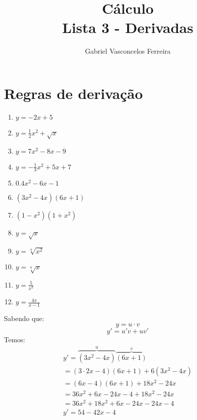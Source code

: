 \documentclass{jhwhw}
\title{Cálculo\\Lista 3 - Derivadas}
\author{Gabriel Vasconcelos Ferreira}
\begin{document}
\maketitle
\chapter{Regras de derivação}
\begin{multicols}{3}[]
    \begin{enumerate}
        \item $\displaystyle y = -2x + 5$
        \item $\displaystyle y = \frac{1}{2}x^2 + \sqrt{x}$
        \item $\displaystyle y = 7x^2- 8x - 9$
        \item $\displaystyle y = -\frac{1}{3} x^2 + 5x + 7$
        \item $\displaystyle 0.4 x^2 -6x -1$
        \item $\displaystyle (3x^2 - 4x)(6x+1)$
        \item $\displaystyle (1-x^2)(1+x^2)$
        \item $\displaystyle y = \sqrt{x}$
        \item $\displaystyle y = \sqrt[4]{x^2}$
        \item $\displaystyle y = \sqrt[9]{x}$
        \item $\displaystyle y = \frac{5}{x^3}$
        \item $\displaystyle y = \frac{4x}{x-1}$
    \end{enumerate}
\end{multicols}
\newpage
{}
Sabendo que:
\[
    y = u \cdot v
\]
\[
    y' = u' v + u v'
\]
Temos:
\begin{multline*}
    y' = \overbrace{(3x^2 - 4x)}^{u}\overbrace{(6x+1)}^{v} \\
    = (3 \cdot 2x - 4)(6x+1) + 6(3x^2-4x) \\
    = (6x-4)(6x+1) + 18x^2 - 24x \\
    = 36x^2 + 6x -24x - 4 + 18x^2 - 24x \\
    = 36x^2 + 18x^2 +6x - 24x - 24x - 4 \\
    \boxed{y' = 54 - 42x - 4}
\end{multline*}
\end{document}
